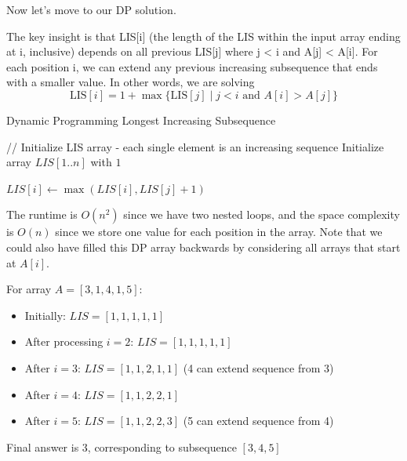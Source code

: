 \documentclass{article}
\begin{document}
    Now let's move to our DP solution. 

    \begin{algo}
      The key insight is that LIS[i] (the length of the LIS within the input array ending at i, inclusive) depends on all previous LIS[j] where j < i and A[j] < A[i]. For each position i, we can extend any previous increasing subsequence that ends with a smaller value. In other words, we are solving 
      \begin{equation}
        \mathrm{LIS}[i] = 1 + \max\{\mathrm{LIS}[j] \mid j < i \text{ and } A[i] > A[j] \}
      \end{equation}

      \begin{algorithm}[H]
        \caption{Dynamic Programming Longest Increasing Subsequence}
        \label{alg:dplis}
        \begin{algorithmic}
            \State // Initialize LIS array - each single element is an increasing sequence
            \State Initialize array $LIS[1..n]$ with $1$  
            
              
                
                  
                  \State $LIS[i] \gets \max(LIS[i], LIS[j] + 1)$  
                \EndIf
              \EndFor
            \EndFor
            
            \State {} 
          \EndFunction
        \end{algorithmic}
      \end{algorithm}

      The runtime is $O(n^2)$ since we have two nested loops, and the space complexity is $O(n)$ since we store one value for each position in the array. Note that we could also have filled this DP array backwards by considering all arrays that start at $A[i]$. 
    \end{algo}

    \begin{example}
      For array $A = [3,1,4,1,5]$:
      \begin{itemize}
        \item Initially: $LIS = [1,1,1,1,1]$
        \item After processing $i=2$: $LIS = [1,1,1,1,1]$
        \item After $i=3$: $LIS = [1,1,2,1,1]$ (4 can extend sequence from 3)
        \item After $i=4$: $LIS = [1,1,2,2,1]$
        \item After $i=5$: $LIS = [1,1,2,2,3]$ (5 can extend sequence from 4)
      \end{itemize}
      Final answer is 3, corresponding to subsequence $[3,4,5]$
    \end{example}
\end{document}

